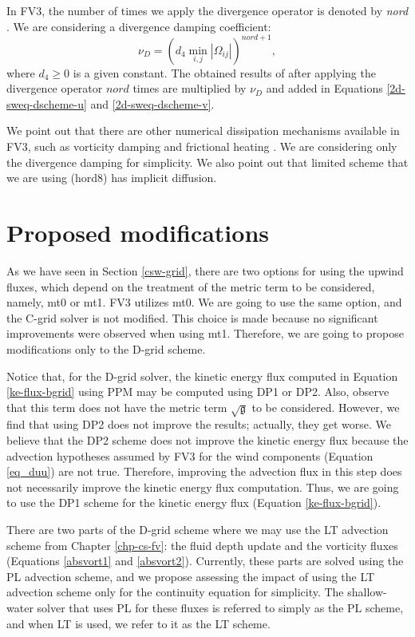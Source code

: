 In FV3, the number of times we apply the divergence operator is denoted by \textit{nord} \citep{harris:2021}.
We are considering a divergence damping coefficient:
\begin{equation}
	\nu_D = (d_4 \min_{i,j} |\Omega_{ij}|)^{nord+1},
\end{equation}
where $d_4 \ge 0$  is a given constant.
The obtained results of after applying the divergence operator $nord$ times
are multiplied by $\nu_D$ and added in Equations \eqref{2d-sweq-dscheme-u} and \eqref{2d-sweq-dscheme-v}.

We point out that there are other numerical dissipation mechanisms available in FV3, such as vorticity damping and frictional heating \citep{harris:2021}. 
We are considering only the divergence damping for simplicity.
We also point out that limited scheme that we are using (hord8) has implicit diffusion.

\section{Proposed modifications}
\label{sw-modf}
As we have seen in Section \ref{csw-grid}, there are two options for using the upwind fluxes, 
which depend on the treatment of the metric term to be considered, namely, mt0 or mt1.
FV3 utilizes mt0. We are going to use the same option, and the C-grid solver is not modified.
This choice is made because no significant improvements were observed when using mt1.
Therefore, we are going to propose modifications only to the D-grid scheme.

Notice that, for the D-grid solver, the kinetic energy flux computed in Equation \eqref{ke-flux-bgrid} using PPM may be computed using DP1 or DP2. 
Also, observe that this term does not have the metric term $\sqrt{\mathfrak{g}}$ to be considered.
However, we find that using DP2 does not improve the results; actually, they get worse.
We believe that the DP2 scheme does not improve the kinetic energy flux because the advection hypotheses 
assumed by FV3 for the wind components (Equation \eqref{eq_duu}) are not true.
Therefore, improving the advection flux in this step does not necessarily improve the kinetic energy flux computation.
Thus, we are going to use the DP1 scheme for the kinetic energy flux (Equation \eqref{ke-flux-bgrid}).

There are two parts of the D-grid scheme where we may use the LT advection scheme from Chapter \ref{chp-cs-fv}:
the fluid depth update and the vorticity fluxes (Equations \eqref{absvort1} and \eqref{absvort2}).
Currently, these parts are solved using the PL advection scheme, and we propose assessing the impact of using the LT advection scheme
only for the continuity equation for simplicity.
The shallow-water solver that uses PL for these fluxes is referred to simply as the PL scheme, and when LT is used, we refer to it as the LT scheme.

